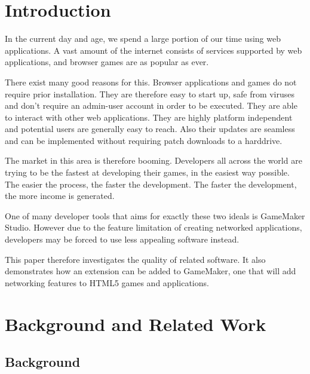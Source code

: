 \documentclass[bsc,frontabs,twoside,singlespacing,parskip,deptreport]{infthesis}     %
\begin{document}
\tableofcontents




\chapter{Introduction}
In the current day and age, we spend a large portion of our time using web applications. A vast amount of the internet consists of services supported by web applications, and browser games are as popular as ever.

There exist many good reasons for this. Browser applications and games do not require prior installation. They are therefore easy to start up, safe from viruses and don't require an admin-user account in order to be executed\cite{Web_Apps_Superior}. They are able to interact with other web applications. They are highly platform independent and potential users are generally easy to reach. Also their updates are seamless and can be implemented without requiring patch downloads to a harddrive.

The market in this area is therefore booming. Developers all across the world are trying to be the fastest at developing their games, in the easiest way possible. The easier the process, the faster the development. The faster the development, the more income is generated.

One of many developer tools that aims for exactly these two ideals is GameMaker Studio. However due to the feature limitation of creating networked applications, developers may be forced to use less appealing software instead. 

This paper therefore investigates the quality of related software. It also demonstrates how an extension can be added to GameMaker, one that will add networking features to HTML5 games and applications.

\chapter{Background and Related Work}
\section{Background}
\end{document}
